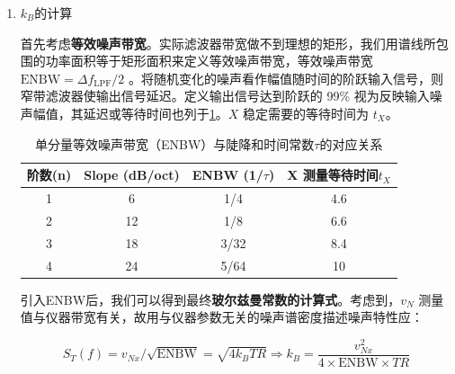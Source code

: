\begin{enumerate}
	此外，锁相放大器自身产生的本底噪声也需要从测量结果中扣除，假设本底噪声的功率为 \( n_{\text{Bx}}^2 \)，最终修正后的噪声功率为：
	\[
	n_{\text{Tx}}^2 = n_{\text{Rx}}^2 \left[ 1 + (\omega R_{\text{in}} C_{\text{in}})^2 \right] - n_{\text{Bx}}^2
	\]
	
	为什么本底噪声不必做输入带宽修正？本底噪声是锁相放大器内部的固有噪声，不经过外部输入电路，因此不会受到输入带宽的影响，也无需进行带宽修正。而外部噪声，如电阻的热噪声，会受到输入阻抗和滤波器的影响，因此需要进行带宽修正。
	
	此外，注意讲义上提到的非随机的环境噪声$n_{ex}$。
	
	实验讲义上提供了具体的数值：影响输入带宽的 $R_{\text{in}}$ 约为 $2/3R$，$C_{\text{in}}$ 约为电缆电容（室温下约为 96pF/m）、锁相放大器输入电容（25pF），与包括连接器和样品盒在内的电容并联后的值的 1/2（约 \textbf{68pF}）。
	
	\item $k_B$的计算
	
	首先考虑\textbf{等效噪声带宽}。实际滤波器带宽做不到理想的矩形，我们用谱线所包围的功率面积等于矩形面积来定义等效噪声带宽，等效噪声带宽 $\text{ENBW} = \Delta f_{\text{LPF}}/2$ 。将随机变化的噪声看作幅值随时间的阶跃输入信号，则窄带滤波器使输出信号延迟。定义输出信号达到阶跃的 99\% 视为反映输入噪声幅值，其延迟或等待时间也列于\cref{tab:ENBW}。$X$ 稳定需要的等待时间为 $t_X$。
	
	\begin{table}[h!]
		\centering
		\caption{单分量等效噪声带宽（ENBW）与陡降和时间常数$\tau$的对应关系}
		\label{tab:ENBW}
		\begin{tabular}{cccc}
			\hline
			\textbf{阶数(n)} & \textbf{Slope (dB/oct)} & \textbf{ENBW (1/$\tau$)} & \textbf{X 测量等待时间$t_X$}\\
			\hline
			1 & 6 & 1/4 & 4.6 \\
			2 & 12 & 1/8 & 6.6 \\
			3 & 18 & 3/32 & 8.4 \\
			4 & 24 & 5/64 & 10 \\
			\hline
		\end{tabular}
	\end{table}
	
	引入ENBW后，我们可以得到最终\textbf{玻尔兹曼常数的计算式}。考虑到，$v_N$ 测量值与仪器带宽有关，故用与仪器参数无关的噪声谱密度描述噪声特性应：
	\begin{ubox}{}
		$$
		S_T(f)=v_{Nx}/\sqrt{\text{ENBW}} = \sqrt{4k_BTR} \Rightarrow k_B = \dfrac{v_{Nx}^2}{4\times\text{ENBW}\times TR}
		$$
	\end{ubox}
	

\end{enumerate}
